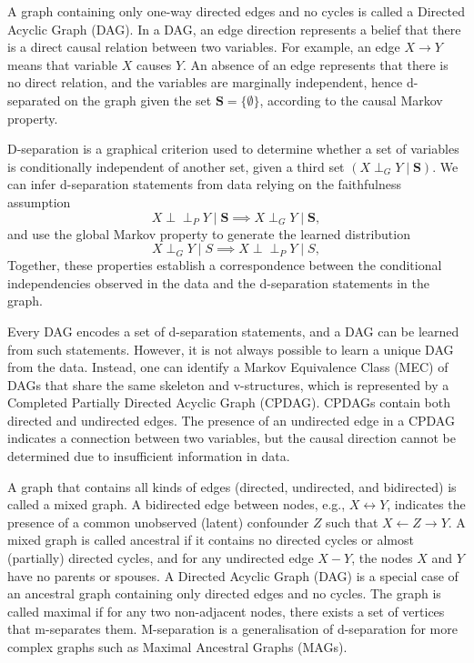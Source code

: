 \documentclass[main.tex]{subfiles}
\begin{document}
A graph containing only one-way directed edges and no cycles is called a Directed Acyclic Graph (DAG). In a DAG, an edge direction represents a belief that there is a direct causal relation between two variables. For example, an edge \(X \rightarrow Y\) means that variable \(X\) causes \(Y\). An absence of an edge represents that there is no direct relation, and the variables are marginally independent, hence d-separated on the graph given the set \(\mathbf{S} = \{\emptyset\}\), according to the causal Markov property.

D-separation is a graphical criterion used to determine whether a set of variables is conditionally independent of another set, given a third set \((X \perp_{G} Y \mid \mathbf{S})\). We can infer d-separation statements from data relying on the faithfulness assumption
\[
X \perp\!\!\!\perp_P Y \mid \mathbf{S} \implies X \perp_G Y \mid \mathbf{S},
\] and use the global Markov property to generate the learned distribution
\[
X \perp_G Y \mid S \implies X \perp\!\!\!\perp_P Y \mid S,
\]
Together, these properties establish a correspondence between the conditional independencies observed in the data and the d-separation statements in the graph.

Every DAG encodes a set of d-separation statements, and a DAG can be learned from such statements. However, it is not always possible to learn a unique DAG from the data. Instead, one can identify a Markov Equivalence Class (MEC) of DAGs that share the same skeleton and v-structures, which is represented by a Completed Partially Directed Acyclic Graph (CPDAG). CPDAGs contain both directed and undirected edges. The presence of an undirected edge in a CPDAG indicates a connection between two variables, but the causal direction cannot be determined due to insufficient information in data.

A graph that contains all kinds of edges (directed, undirected, and bidirected) is called a mixed graph. A bidirected edge between nodes, e.g., \( X \leftrightarrow Y \), indicates the presence of a common unobserved (latent) confounder \( Z \) such that \( X \leftarrow Z \rightarrow Y \). A mixed graph is called ancestral if it contains no directed cycles or almost (partially) directed cycles, and for any undirected edge \( X - Y \), the nodes \( X \) and \( Y \) have no parents or spouses. A Directed Acyclic Graph (DAG) is a special case of an ancestral graph containing only directed edges and no cycles. The graph is called maximal if for any two non-adjacent nodes, there exists a set of vertices that m-separates them. M-separation is a generalisation of d-separation for more complex graphs such as Maximal Ancestral Graphs (MAGs). 
\end{document}

